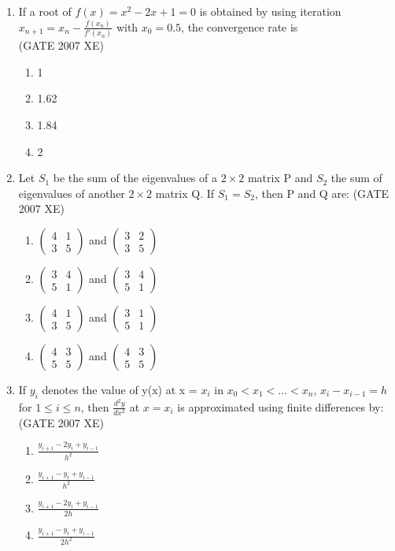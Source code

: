 \documentclass[journal,cmex10]{IEEEtran}
\theoremstyle{remark}
\newcommand{\myvec}[1]{\ensuremath{\begin{pmatrix}#1\end{pmatrix}}}
\numberwithin{equation}{enumi}
\numberwithin{figure}{enumi}
\begin{document}
\begin{enumerate}[label=\arabic*)]
    \item If a root of $f(x) = x^2 - 2x + 1 = 0$ is obtained by using iteration $x_{n+1} = x_n - \frac{f(x_n)}{f'(x_n)}$ with $x_0 = 0.5$, the convergence rate is\\
   \hfill{(GATE 2007 XE)}
   \begin{multicols}{4}
    \begin{enumerate}
        \item 1
        \item 1.62
        \item 1.84
        \item 2
    \end{enumerate}
\end{multicols}

    \item Let $S_1$ be the sum of the eigenvalues of a $2 \times 2$ matrix P and $S_2$ the sum of eigenvalues of another $2 \times 2$ matrix Q. If $S_1 = S_2$, then P and Q  are:
    \hfill{(GATE 2007 XE)}
    \begin{multicols}{2}
    \begin{enumerate}
        \item $\myvec{4 & 1 \\ 3 & 5}$ and $\myvec{ 3 & 2 \\ 3 & 5}$
        \item $\myvec{3 & 4 \\ 5 & 1 }$ and $\myvec{3 & 4 \\ 5 & 1 }$
        \item $\myvec{4 & 1 \\ 3 & 5 }$ and $\myvec{3 & 1 \\ 5 & 1 }$
        \item $\myvec{4 & 3 \\ 5 & 5 }$ and $\myvec{4 & 3 \\ 5 & 5 }$
    \end{enumerate}
\end{multicols}

    \item If $y_i$ denotes the value of y(x) at x = $x_i$ in  $x_0 < x_1 < \dots < x_n$, $x_i - x_{i-1} = h$ for $1 \le i \le n$, then  $\frac{d^2 y}{dx^2}$ at $x = x_i$ is approximated using finite differences by:\\
    \hfill{(GATE 2007 XE)}
    \begin{multicols}{4}
    \begin{enumerate}
        \item $\frac{y_{i+1} - 2y_i + y_{i-1}}{h^2}$
        \vspace{0.1cm}
        \item $\frac{y_{i+1} - y_i + y_{i-1}}{h^2}$
        \vspace{0.1cm}
        \item $\frac{y_{i+1} - 2y_i + y_{i-1}}{2h}$
        \vspace{0.1cm}
        \item $\frac{y_{i+1} - y_i + y_{i-1}}{2h^2}$
    \end{enumerate}
\end{multicols}


\end{enumerate}
\end{document}
